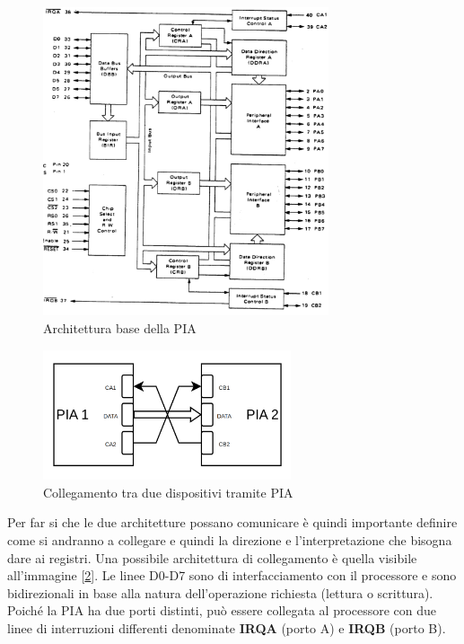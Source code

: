 \begin{figure}
    \centering
    \includegraphics[width=0.75\textwidth]{img/PIA-SCHEME.jpg}
    \caption{Architettura base della PIA}\label{img:PIA}
\end{figure}

\begin{figure}
    \centering
    \includegraphics[width=0.65\textwidth]{img/PIA-CON.png}
    \caption{Collegamento tra due dispositivi tramite PIA}\label{img:PIA-CON}
\end{figure}

Per far si che le due architetture possano comunicare è quindi importante definire come si andranno a collegare e quindi la direzione e l'interpretazione che bisogna dare ai registri. Una possibile architettura di collegamento è quella visibile all'immagine [\ref{img:PIA-CON}].
Le linee D0-D7 sono di interfacciamento con il processore e sono bidirezionali in base alla natura dell'operazione richiesta (lettura o scrittura). 
Poiché la PIA ha due porti distinti, può essere collegata al processore con due linee di interruzioni differenti denominate \textbf{IRQA} (porto A) e \textbf{IRQB} (porto B).  

